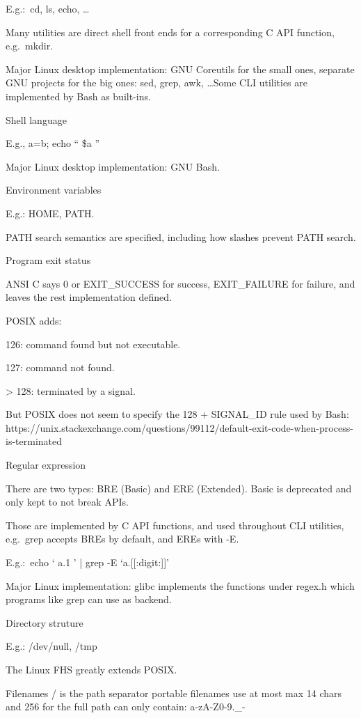    E.g.:\ cd, ls, echo, \ldots

    Many utilities are direct shell front ends for a corresponding C API
	function, e.g.\ mkdir.

    Major Linux desktop implementation: GNU Coreutils for the small ones,
	separate GNU projects for the big ones: sed, grep, awk, \ldots Some CLI utilities are implemented by Bash as built-ins.


	Shell language

E.g., a=b; echo `` \$a ''

Major Linux desktop implementation: GNU Bash.

Environment variables

E.g.: HOME, PATH.\

PATH search semantics are specified, including how slashes prevent PATH search.

    Program exit status

    ANSI C says 0 or EXIT\_SUCCESS for success, EXIT\_FAILURE for failure, and leaves the rest implementation defined.

    POSIX adds:

        126: command found but not executable.

        127: command not found.

        > 128: terminated by a signal.

        But POSIX does not seem to specify the 128 + SIGNAL\_ID rule used by Bash: https://unix.stackexchange.com/questions/99112/default-exit-code-when-process-is-terminated

    Regular expression

    There are two types: BRE (Basic) and ERE (Extended). Basic is deprecated and only kept to not break APIs.

    Those are implemented by C API functions, and used throughout CLI utilities,
	e.g.\ grep accepts BREs by default, and EREs with -E.

    E.g.:\ echo ` a.1 ' | grep -E `a.[[:digit:]]'

    Major Linux implementation: glibc implements the functions under regex.h which programs like grep can use as backend.

    Directory struture

    E.g.: /dev/null, /tmp

    The Linux FHS greatly extends POSIX.\

    Filenames
        / is the path separator
        portable filenames
            use at most max 14 chars and 256 for the full path
            can only contain: a-zA-Z0-9.\_-

